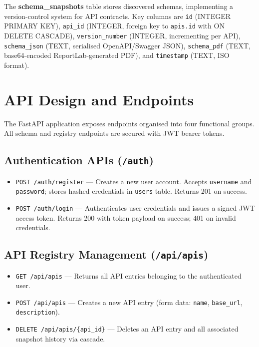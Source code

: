\documentclass{fisatprojectfinal}
\begin{document}
The \textbf{schema\_snapshots} table stores discovered schemas, implementing a version-control system for API contracts. Key columns are \texttt{id} (INTEGER PRIMARY KEY), \texttt{api\_id} (INTEGER, foreign key to \texttt{apis.id} with ON DELETE CASCADE), \texttt{version\_number} (INTEGER, incrementing per API), \texttt{schema\_json} (TEXT, serialised OpenAPI/Swagger JSON), \texttt{schema\_pdf} (TEXT, base64-encoded ReportLab-generated PDF), and \texttt{timestamp} (TEXT, ISO format).

\section{API Design and Endpoints}
The FastAPI application exposes endpoints organised into four functional groups. All schema and registry endpoints are secured with JWT bearer tokens.

\subsection{Authentication APIs (\texttt{/auth})}
\begin{itemize}
    \item \texttt{POST /auth/register} --- Creates a new user account. Accepts \texttt{username} and \texttt{password}; stores hashed credentials in \texttt{users} table. Returns 201 on success.
    \item \texttt{POST /auth/login} --- Authenticates user credentials and issues a signed JWT access token. Returns 200 with token payload on success; 401 on invalid credentials.
\end{itemize}

\subsection{API Registry Management (\texttt{/api/apis})}
\begin{itemize}
    \item \texttt{GET /api/apis} --- Returns all API entries belonging to the authenticated user.
    \item \texttt{POST /api/apis} --- Creates a new API entry (form data: \texttt{name}, \texttt{base\_url}, \texttt{description}).
    \item \texttt{DELETE /api/apis/\{api\_id\}} --- Deletes an API entry and all associated snapshot history via cascade.
\end{itemize}
\end{document}

